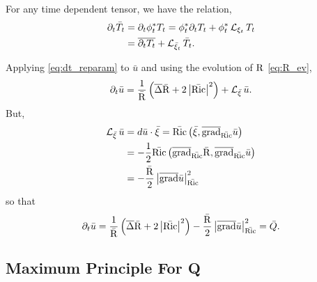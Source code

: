 \documentclass{amsart}
\begin{document}
For any time dependent tensor, we have the relation,
\begin{equation}
\label{eq:dt_reparam}
\begin{split}
\partial_t \bar{T}_t &= \partial_t \phi_t^{\ast} T_t = \phi_t^{\ast} \partial_t T_t + \phi_t^{\ast} \operatorname{\mathcal{L}}_{\xi_t} T_t \\
&= \overline{\partial_t T_t} + \operatorname{\mathcal{L}}_{\bar{\xi}_t} \bar{T}_t.
\end{split}
\end{equation}

Applying \eqref{eq:dt_reparam} to \(\bar{u}\) and using the evolution of \(\operatorname{R}\) \eqref{eq:R_ev},
\[
\partial_t \bar{u} = \frac{1}{\bar{\operatorname{R}}} \left(\overline{\operatorname{\Delta}} \bar{\operatorname{R}} + 2\left|{\bar{\operatorname{Ric}}}\right|^2\right) + \operatorname{\mathcal{L}}_{\bar{\xi}} \bar{u}.
\]
But,
\[
\begin{split}
\operatorname{\mathcal{L}}_{\bar{\xi}} \bar{u} &= d\bar{u} \cdot \bar{\xi} = \bar{\operatorname{Ric}} \left(\bar{\xi}, \overline{\operatorname{grad}}_{\bar{\operatorname{Ric}}} \bar{u}\right) \\
&= -\frac{1}{2} \bar{\operatorname{Ric}} \left(\overline{\operatorname{grad}}_{\bar{\operatorname{Ric}}} \bar{\operatorname{R}}, \overline{\operatorname{grad}}_{\bar{\operatorname{Ric}}} \bar{u}\right) \\
&= -\frac{\bar{\operatorname{R}}}{2} \left|{\overline{\operatorname{grad}} \bar{u}}\right|_{\bar{\operatorname{Ric}}}^2
\end{split}
\]
so that
\begin{equation}
\label{eq:dtu_reparm}
\partial_t \bar{u} = \frac{1}{\bar{\operatorname{R}}} \left(\overline{\operatorname{\Delta}} \bar{\operatorname{R}} + 2\left|{\bar{\operatorname{Ric}}}\right|^2\right) - \frac{\bar{\operatorname{R}}}{2} \left|{\overline{\operatorname{grad}} \bar{u}}\right|_{\bar{\operatorname{Ric}}}^2 = \bar{Q}.
\end{equation}

\subsection{Maximum Principle For Q}
\label{subsec:harnack_Q}
\end{document}
